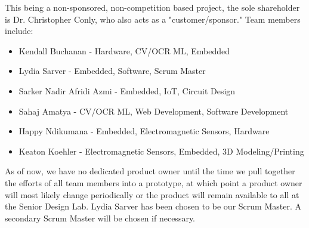 This being a non-sponsored, non-competition based project, the sole shareholder is Dr. Christopher Conly, who also acts as a "customer/sponsor."
Team members include: 
\begin{itemize}
\item Kendall Buchanan - Hardware, CV/OCR ML, Embedded
\item Lydia Sarver - Embedded, Software, Scrum Master
\item Sarker Nadir Afridi Azmi - Embedded, IoT, Circuit Design
\item Sahaj Amatya - CV/OCR ML, Web Development, Software Development
\item Happy Ndikumana - Embedded, Electromagnetic Sensors, Hardware
\item Keaton Koehler - Electromagnetic Sensors, Embedded, 3D Modeling/Printing
\end{itemize}

As of now, we have no dedicated product owner until the time we pull together the efforts of all team members into a prototype, at which point a product owner will most likely change periodically or the product will remain available to all at the Senior Design Lab. Lydia Sarver has been chosen to be our Scrum Master. A secondary Scrum Master will be chosen if necessary.
